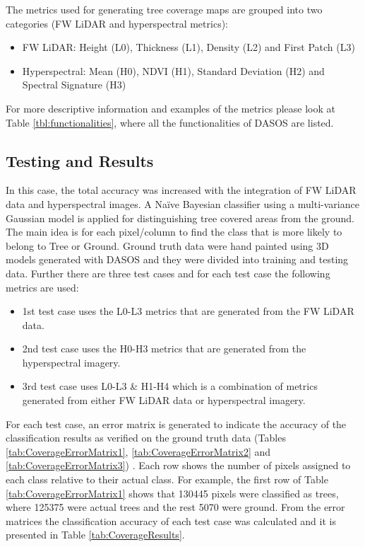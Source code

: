 \documentclass{subfiles}
\begin{document}
\par The metrics used for generating tree coverage maps are grouped into two categories (FW LiDAR and hyperspectral metrics):
\begin{itemize}
	\item FW LiDAR: Height (L0), Thickness (L1), Density (L2) and First Patch (L3)
	\item Hyperspectral: Mean (H0), NDVI (H1), Standard Deviation (H2) and Spectral Signature (H3)
\end{itemize}
For more descriptive information and examples of the metrics please look at Table \ref{tbl:functionalities}, where all the functionalities of DASOS are listed.  


\subsection{Testing and Results}

\par In this case, the total accuracy was increased with the integration of FW LiDAR data and hyperspectral images. A Naïve Bayesian classifier using a multi-variance Gaussian model is applied for distinguishing tree covered areas from the ground. The main idea is for each pixel/column to find the class that is more likely to belong to Tree or Ground.  Ground truth data were hand painted using 3D models generated with DASOS and they were divided into training and testing data. Further there are three test cases and for each test case the following metrics are used:

\begin{itemize}
	\item 1st test case uses the L0-L3 metrics that are generated from the FW LiDAR data.
	\item 2nd test case uses the H0-H3 metrics that are generated from the hyperspectral imagery.
	\item 3rd test case uses L0-L3 \& H1-H4 which is a combination of metrics generated from either FW LiDAR data or hyperspectral imagery. 
\end{itemize}

\par For each test case, an error matrix is generated to indicate the accuracy of the classification results as verified on the ground truth data (Tables \ref{tab:CoverageErrorMatrix1}, \ref{tab:CoverageErrorMatrix2} and \ref{tab:CoverageErrorMatrix3}) \cite{Congalton1991}. Each row shows the number of pixels assigned to each class relative to their actual class. For example, the first row of Table \ref{tab:CoverageErrorMatrix1} shows that 130445 pixels were classified as trees, where 125375 were actual trees and the rest 5070 were ground. From the error matrices the classification accuracy of each test case was calculated and it is presented in Table \ref{tab:CoverageResults}.
\end{document}
